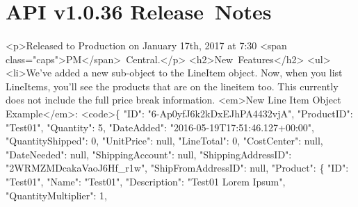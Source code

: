 \documentclass{memoir}%
\begin{document}
%
\section*{API v1.0.36 Release~Notes}%
\paragraph*{}%

%
\paragraph*{}%
<p>Released to Production on January 17th, 2017 at 7:30 <span class="caps">PM</span>~Central.</p>\newline%
<h2>New~Features</h2>\newline%
<ul>\newline%
<li>We’ve added a new sub{-}object to the LineItem object. Now, when you list LineItems, you’ll see the products that are on the lineitem too. This currently does not include the full price break information.\newline%
    <em>New Line Item Object Example</em>:\newline%
    <code>\{\newline%
      "ID": "6{-}Ap0yfJ6k2kDxEJhPA4432vjA",\newline%
      "ProductID": "Test01",\newline%
      "Quantity": 5,\newline%
      "DateAdded": "2016{-}05{-}19T17:51:46.127+00:00",\newline%
      "QuantityShipped": 0,\newline%
      "UnitPrice": null,\newline%
      "LineTotal": 0,\newline%
      "CostCenter": null,\newline%
      "DateNeeded": null,\newline%
      "ShippingAccount": null,\newline%
      "ShippingAddressID": "2WRMZMDcakaVaoJ6Hf\_r1w",\newline%
      "ShipFromAddressID": null,\newline%
      "Product": \{\newline%
        "ID": "Test01",\newline%
        "Name": "Test01",\newline%
        "Description": "Test01 Lorem Ipsum",\newline%
        "QuantityMultiplier": 1,\newline%
\end{document}
